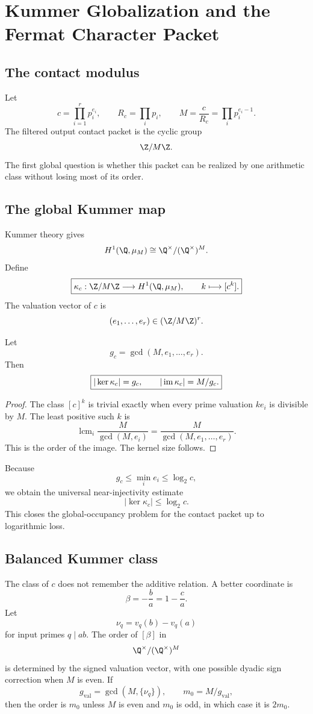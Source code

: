 \section{Kummer Globalization and the Fermat Character Packet}

\subsection{The contact modulus}
Let
\[
 c=\prod_{i=1}^{r}p_i^{e_i},
 \qquad
 R_c=\prod_i p_i,
 \qquad
 M=\frac{c}{R_c}
 =\prod_i p_i^{e_i-1}.
\]
The filtered output contact packet is the cyclic group
\[
 \Z/M\Z.
\]
The first global question is whether this packet can be realized by one arithmetic class without losing most of its order.

\subsection{The global Kummer map}
Kummer theory gives
\[
 H^1(\Q,\mu_M)
 \cong
 \Q^\times/(\Q^\times)^M.
\]
Define
\[
 \boxed{
 \kappa_c:
 \Z/M\Z
 \longrightarrow
 H^1(\Q,\mu_M),
 \qquad
 k\longmapsto[c^k].
 }
\]
The valuation vector of $c$ is
\[
 (e_1,\ldots,e_r)
 \in
 (\Z/M\Z)^r.
\]

\begin{theorem}
Let
\[
 g_c=\gcd(M,e_1,\ldots,e_r).
\]
Then
\[
 \boxed{
 |\ker\kappa_c|=g_c,
 \qquad
 |\operatorname{im}\kappa_c|=M/g_c.
 }
\]
\end{theorem}

\begin{proof}
The class $[c]^k$ is trivial exactly when every prime valuation $ke_i$ is divisible by $M$. The least positive such $k$ is
\[
 \operatorname{lcm}_i
 \frac{M}{\gcd(M,e_i)}
 =
 \frac{M}{\gcd(M,e_1,\ldots,e_r)}.
\]
This is the order of the image. The kernel size follows.
\end{proof}

Because
\[
 g_c\le\min_i e_i\le\log_2 c,
\]
we obtain the universal near-injectivity estimate
\[
 \boxed{
 |\ker\kappa_c|\le\log_2c.
 }
\]
This closes the global-occupancy problem for the contact packet up to logarithmic loss.

\subsection{Balanced Kummer class}
The class of $c$ does not remember the additive relation. A better coordinate is
\[
 \beta=-\frac ba=1-\frac ca.
\]
Let
\[
 \nu_q=v_q(b)-v_q(a)
\]
for input primes $q\mid ab$. The order of $[\beta]$ in
\[
 \Q^\times/(\Q^\times)^M
\]
is determined by the signed valuation vector, with one possible dyadic sign correction when $M$ is even. If
\[
 g_{\mathrm{val}}
 =
 \gcd(M,\{\nu_q\}),
 \qquad
 m_0=M/g_{\mathrm{val}},
\]
then the order is $m_0$ unless $M$ is even and $m_0$ is odd, in which case it is $2m_0$.

